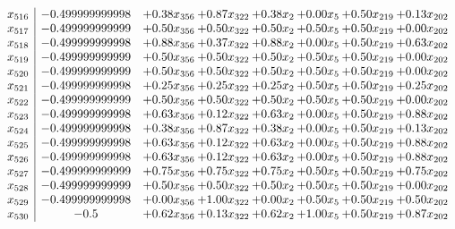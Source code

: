 \documentclass[8pt]{article}
\begin{document}
\[\begin{array}{c| c c@{\hskip 2pt} c@{\hskip 2pt} c@{\hskip 2pt} c@{\hskip 2pt} c@{\hskip 2pt} c@{\hskip 2pt} }
 x_{516}   &  -0.499999999998 & +  0.38 x_{356} & +  0.87 x_{322} & +  0.38 x_{2} & +  0.00 x_{5} & +  0.50 x_{219} & +  0.13 x_{202}\\
 x_{517}   &  -0.499999999999 & +  0.50 x_{356} & +  0.50 x_{322} & +  0.50 x_{2} & +  0.50 x_{5} & +  0.50 x_{219} & +  0.00 x_{202}\\
 x_{518}   &  -0.499999999998 & +  0.88 x_{356} & +  0.37 x_{322} & +  0.88 x_{2} & +  0.00 x_{5} & +  0.50 x_{219} & +  0.63 x_{202}\\
 x_{519}   &  -0.499999999999 & +  0.50 x_{356} & +  0.50 x_{322} & +  0.50 x_{2} & +  0.50 x_{5} & +  0.50 x_{219} & +  0.00 x_{202}\\
 x_{520}   &  -0.499999999999 & +  0.50 x_{356} & +  0.50 x_{322} & +  0.50 x_{2} & +  0.50 x_{5} & +  0.50 x_{219} & +  0.00 x_{202}\\
 x_{521}   &  -0.499999999998 & +  0.25 x_{356} & +  0.25 x_{322} & +  0.25 x_{2} & +  0.50 x_{5} & +  0.50 x_{219} & +  0.25 x_{202}\\
 x_{522}   &  -0.499999999999 & +  0.50 x_{356} & +  0.50 x_{322} & +  0.50 x_{2} & +  0.50 x_{5} & +  0.50 x_{219} & +  0.00 x_{202}\\
 x_{523}   &  -0.499999999998 & +  0.63 x_{356} & +  0.12 x_{322} & +  0.63 x_{2} & +  0.00 x_{5} & +  0.50 x_{219} & +  0.88 x_{202}\\
 x_{524}   &  -0.499999999998 & +  0.38 x_{356} & +  0.87 x_{322} & +  0.38 x_{2} & +  0.00 x_{5} & +  0.50 x_{219} & +  0.13 x_{202}\\
 x_{525}   &  -0.499999999998 & +  0.63 x_{356} & +  0.12 x_{322} & +  0.63 x_{2} & +  0.00 x_{5} & +  0.50 x_{219} & +  0.88 x_{202}\\
 x_{526}   &  -0.499999999998 & +  0.63 x_{356} & +  0.12 x_{322} & +  0.63 x_{2} & +  0.00 x_{5} & +  0.50 x_{219} & +  0.88 x_{202}\\
 x_{527}   &  -0.499999999999 & +  0.75 x_{356} & +  0.75 x_{322} & +  0.75 x_{2} & +  0.50 x_{5} & +  0.50 x_{219} & +  0.75 x_{202}\\
 x_{528}   &  -0.499999999999 & +  0.50 x_{356} & +  0.50 x_{322} & +  0.50 x_{2} & +  0.50 x_{5} & +  0.50 x_{219} & +  0.00 x_{202}\\
 x_{529}   &  -0.499999999998 & +  0.00 x_{356} & +  1.00 x_{322} & +  0.00 x_{2} & +  0.50 x_{5} & +  0.50 x_{219} & +  0.50 x_{202}\\
 x_{530}   &  -0.5 & +  0.62 x_{356} & +  0.13 x_{322} & +  0.62 x_{2} & +  1.00 x_{5} & +  0.50 x_{219} & +  0.87 x_{202}\\

\end{array}\]
\end{document}
